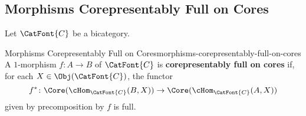 \subsection{Morphisms Corepresentably Full on Cores}\label{subsection-morphisms-corepresentably-full-on-cores}
Let $\CatFont{C}$ be a bicategory.
\begin{definition}{Morphisms Corepresentably Full on Cores}{morphisms-corepresentably-full-on-cores}%
    A $1$-morphism $f\colon A\to B$ of $\CatFont{C}$ is \textbf{corepresentably full on cores} if, for each $X\in\Obj(\CatFont{C})$, the functor
    \[
        f^{*}%
        \colon%
        \Core(\cHom_{\CatFont{C}}(B,X))%
        \to%
        \Core(\cHom_{\CatFont{C}}(A,X))%
    \]%
    given by precomposition by $f$ is full.
\end{definition}
